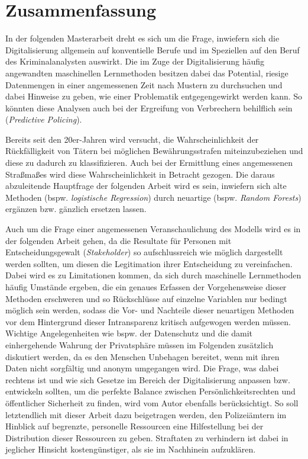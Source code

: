 \documentclass[a4paper,12pt,parskip,bibtotoc,liststotoc]{article}
\begin{document}
\section{Zusammenfassung}

In der folgenden Masterarbeit dreht es sich um die Frage, inwiefern sich die Digitalisierung allgemein auf konventielle Berufe und im Speziellen auf den Beruf des Kriminalanalysten auswirkt. Die im Zuge der Digitalisierung häufig angewandten maschinellen Lernmethoden besitzen dabei das Potential, riesige Datenmengen in einer angemessenen Zeit nach Mustern zu durchsuchen und dabei Hinweise zu geben, wie einer Problematik entgegengewirkt werden kann. 
So könnten diese Analysen auch bei der Ergreifung von Verbrechern behilflich sein (\textit{Predictive Policing}).

Bereits seit den 20er-Jahren wird versucht, die Wahrscheinlichkeit der Rückfälligkeit von Tätern bei möglichen Bewährungsstrafen miteinzubeziehen und diese zu dadurch zu klassifizieren.
Auch bei der Ermittlung eines angemessenen Straßmaßes wird diese Wahrscheinlichkeit in Betracht gezogen.
Die daraus abzuleitende Hauptfrage der folgenden Arbeit wird es sein, inwiefern sich alte Methoden (bspw. \textit{logistische Regression}) durch neuartige (bspw. \textit{Random Forests}) ergänzen bzw. gänzlich ersetzen lassen.

Auch um die Frage einer angemessenen Veranschaulichung des Modells wird es in der folgenden Arbeit gehen, da die Resultate für Personen mit Entscheidungsgewalt (\textit{Stakeholder}) so aufschlussreich wie möglich dargestellt werden sollten, um diesen die Legitimation ihrer Entscheidung zu vereinfachen.
Dabei wird es zu Limitationen kommen, da sich durch maschinelle Lernmethoden häufig Umstände ergeben, die ein genaues Erfassen der Vorgehensweise dieser Methoden erschweren und so Rückschlüsse auf einzelne Variablen nur bedingt möglich sein werden, sodass die Vor- und Nachteile dieser neuartigen Methoden vor dem Hintergrund dieser Intransparenz kritisch aufgewogen werden müssen.\\

Wichtige Angelegenheiten wie bspw. der Datenschutz und die damit einhergehende Wahrung der Privatsphäre müssen im Folgenden zusätzlich diskutiert werden, da es den Menschen Unbehagen bereitet, wenn mit ihren Daten nicht sorgfältig und anonym umgegangen wird. 
Die Frage, was dabei rechtens ist und wie sich Gesetze im Bereich der Digitalisierung anpassen bzw. entwickeln sollten, um die perfekte Balance zwischen Persönlichkeitsrechten und öffentlicher Sicherheit zu finden, wird vom Autor ebenfalls berücksichtigt.
So soll letztendlich mit dieser Arbeit dazu beigetragen werden, den Polizeiämtern im Hinblick auf begrenzte, personelle Ressourcen eine Hilfestellung bei der Distribution dieser Ressourcen zu geben. 
Straftaten zu verhindern ist dabei in jeglicher Hinsicht kostengünstiger, als sie im Nachhinein aufzuklären.
\end{document}
